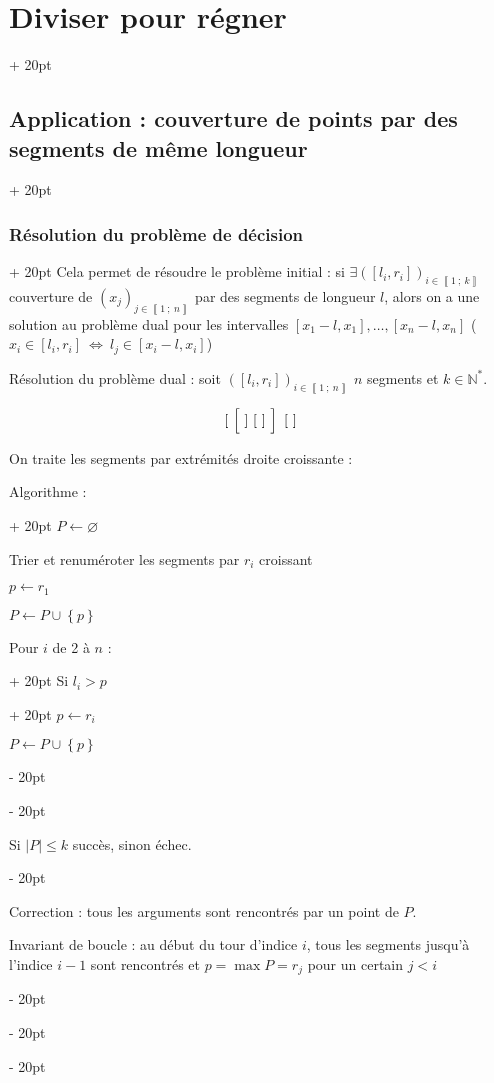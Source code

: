 \documentclass[a4paper, 12pt, twoside]{article}
\newcommand{\N}{\mathbb{N}} %
\newcommand{\nset}[2]{\left\llbracket #1\ ;\ #2 \right\rrbracket}
\newcommand{\set}[1]{\left\{ #1 \right\}}
\newcommand{\abs}[1]{\left\lvert #1 \right\rvert} %
\newcommand{\ssi}{\ \Leftrightarrow \ }
\renewcommand{\le}{\leqslant}
\newcommand{\ind}[1][20pt]{\advance\leftskip + #1}
\newcommand{\deind}[1][20pt]{\advance\leftskip - #1}
\newenvironment{indt}[2][20pt]{#2 \par \ind[#1]}{\par \deind} %
\begin{document}
\begin{indt}{\section{Diviser pour régner}}
\begin{indt}{\subsection{Application : couverture de points par des segments de même longueur}}
\begin{indt}{\subsubsection{Résolution du problème de décision}}
                Cela permet de résoudre le problème initial : si $\exists ([l_i, r_i])_{i \in \nset 1 k}$ couverture de $(x_j)_{j \in \nset 1 n}$ par des segments de longueur $l$, alors on a une solution au problème dual pour les intervalles $[x_1 - l, x_1], \ldots, [x_n - l, x_n]$ ($x_i \in [l_i, r_i] \ssi l_j \in [x_i - l, x_i]$)
                
                \vspace{6pt}
                
                Résolution du problème dual : soit $([l_i, r_i])_{i \in \nset 1 n}$ $n$ segments et $k \in \N^*$.
                
                    \[ [\ \left[\ \vphantom{\dfrac a a} ]\ [\ ]\ \right]\ [\ ] \]
                
                On traite les segments par extrémités droite croissante :
                
                \begin{indt}{Algorithme :}
                    $P \leftarrow \varnothing$
                    
                    Trier et renuméroter les segments par $r_i$ croissant
                    
                    $p \leftarrow r_1$
                    
                    $P \leftarrow P \cup \set p$
                    
                    \begin{indt}{Pour $i$ de 2 à $n$ :}
                        \begin{indt}{Si $l_i > p$}
                            $p \leftarrow r_i$
                            
                            $P \leftarrow P \cup \set p$
                        \end{indt}
                    \end{indt}
                    
                    Si $\abs P \le k$ succès, sinon échec.
                \end{indt}
                
                Correction : tous les arguments sont rencontrés par un point de $P$.
                
                Invariant de boucle : au début du tour d'indice $i$, tous les segments jusqu'à l'indice $i - 1$ sont rencontrés et $p = \max P = r_j$ pour un certain $j < i$
                

\end{indt}
\end{indt}
\end{indt}
\end{document}
